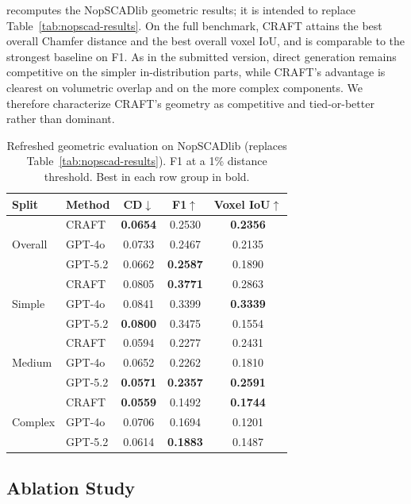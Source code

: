  recomputes the NopSCADlib geometric results; it is intended to replace Table~\ref{tab:nopscad-results}. On the full benchmark, CRAFT attains the best overall Chamfer distance and the best overall voxel IoU, and is comparable to the strongest baseline on F1. As in the submitted version, direct generation remains competitive on the simpler in-distribution parts, while CRAFT's advantage is clearest on volumetric overlap and on the more complex components. We therefore characterize CRAFT's geometry as competitive and tied-or-better rather than dominant.

\begin{table}[t!]
\centering
\caption{Refreshed geometric evaluation on NopSCADlib (replaces Table~\ref{tab:nopscad-results}). F1 at a 1\% distance threshold. Best in each row group in bold.}
\label{tab:nopscad-r}
\small
\setlength{\tabcolsep}{6pt}
\begin{tabular}{llccc}
\toprule
Split & Method & CD$\downarrow$ & F1$\uparrow$ & Voxel IoU$\uparrow$ \\
\midrule
\multirow{3}{*}{Overall}
& CRAFT   & \textbf{0.0654} & 0.2530 & \textbf{0.2356} \\
& GPT-4o  & 0.0733 & 0.2467 & 0.2135 \\
& GPT-5.2 & 0.0662 & \textbf{0.2587} & 0.1890 \\
\midrule
\multirow{3}{*}{Simple}
& CRAFT   & 0.0805 & \textbf{0.3771} & 0.2863 \\
& GPT-4o  & 0.0841 & 0.3399 & \textbf{0.3339} \\
& GPT-5.2 & \textbf{0.0800} & 0.3475 & 0.1554 \\
\midrule
\multirow{3}{*}{Medium}
& CRAFT   & 0.0594 & 0.2277 & 0.2431 \\
& GPT-4o  & 0.0652 & 0.2262 & 0.1810 \\
& GPT-5.2 & \textbf{0.0571} & \textbf{0.2357} & \textbf{0.2591} \\
\midrule
\multirow{3}{*}{Complex}
& CRAFT   & \textbf{0.0559} & 0.1492 & \textbf{0.1744} \\
& GPT-4o  & 0.0706 & 0.1694 & 0.1201 \\
& GPT-5.2 & 0.0614 & \textbf{0.1883} & 0.1487 \\
\bottomrule
\end{tabular}
\end{table}

\subsection{Ablation Study}
\label{subsec:ablation}

